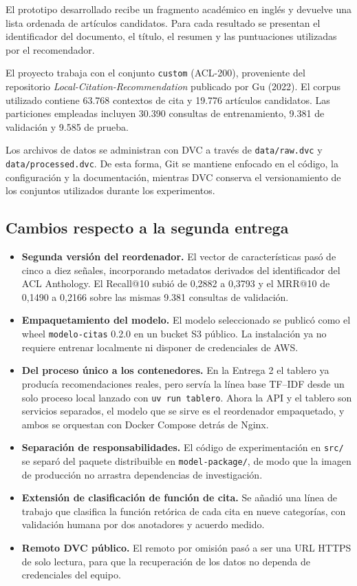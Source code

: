 \documentclass[9pt]{article}
\begin{document}
El prototipo desarrollado recibe un fragmento académico en inglés y devuelve
una lista ordenada de artículos candidatos. Para cada resultado se presentan
el identificador del documento, el título, el resumen y las puntuaciones
utilizadas por el recomendador.

El proyecto trabaja con el conjunto \texttt{custom} (ACL-200), proveniente del
repositorio \textit{Local-Citation-Recommendation} publicado por Gu (2022).
El corpus utilizado contiene 63.768 contextos de cita y 19.776 artículos
candidatos. Las particiones empleadas incluyen 30.390 consultas de entrenamiento,
9.381 de validación y 9.585 de prueba.

Los archivos de datos se administran con DVC a través de
\texttt{data/raw.dvc} y \texttt{data/processed.dvc}. De esta forma, Git se
mantiene enfocado en el código, la configuración y la documentación, mientras
DVC conserva el versionamiento de los conjuntos utilizados durante los
experimentos.

\subsection{Cambios respecto a la segunda entrega}

\begin{itemize}
    \item \textbf{Segunda versión del reordenador.} El vector de características
    pasó de cinco a diez señales, incorporando metadatos derivados del
    identificador del ACL Anthology. El Recall@10 subió de 0,2882 a 0,3793 y el
    MRR@10 de 0,1490 a 0,2166 sobre las mismas 9.381 consultas de validación.
    \item \textbf{Empaquetamiento del modelo.} El modelo seleccionado se publicó
    como el wheel \texttt{modelo-citas} 0.2.0 en un bucket S3 público. La
    instalación ya no requiere entrenar localmente ni disponer de credenciales de
    AWS.
    \item \textbf{Del proceso único a los contenedores.} En la Entrega 2 el
    tablero ya producía recomendaciones reales, pero servía la línea base TF--IDF
    desde un solo proceso local lanzado con \texttt{uv run tablero}. Ahora la API
    y el tablero son servicios separados, el modelo que se sirve es el reordenador
    empaquetado, y ambos se orquestan con Docker Compose detrás de Nginx.
    \item \textbf{Separación de responsabilidades.} El código de
    experimentación en \texttt{src/} se separó del paquete distribuible en
    \texttt{model-package/}, de modo que la imagen de producción no arrastra
    dependencias de investigación.
    \item \textbf{Extensión de clasificación de función de cita.} Se añadió una
    línea de trabajo que clasifica la función retórica de cada cita en nueve
    categorías, con validación humana por dos anotadores y acuerdo medido.
    \item \textbf{Remoto DVC público.} El remoto por omisión pasó a ser una URL
    HTTPS de solo lectura, para que la recuperación de los datos no dependa de
    credenciales del equipo.
\end{itemize}
\end{document}
